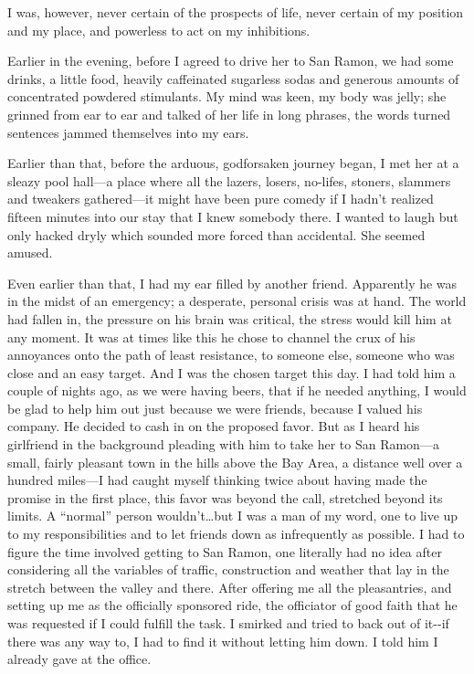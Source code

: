 I was, however, never certain of the prospects of life, never certain of
my position and my place, and powerless to act on my inhibitions.

Earlier in the evening, before I agreed to drive her to San Ramon, we
had some drinks, a little food, heavily caffeinated sugarless sodas and
generous amounts of concentrated powdered stimulants. My mind was keen,
my body was jelly; she grinned from ear to ear and talked of her life in
long phrases, the words turned sentences jammed themselves into my ears.

Earlier than that, before the arduous, godforsaken journey began, I met
her at a sleazy pool hall---a place where all the lazers, losers,
no-lifes, stoners, slammers and tweakers gathered---it might have been
pure comedy if I hadn't realized fifteen minutes into our stay that I
knew somebody there. I wanted to laugh but only hacked dryly which
sounded more forced than accidental. She seemed amused.

Even earlier than that, I had my ear filled by another friend.
Apparently he was in the midst of an emergency; a desperate, personal
crisis was at hand. The world had fallen in, the pressure on his brain
was critical, the stress would kill him at any moment. It was at times
like this he chose to channel the crux of his annoyances onto the path
of least resistance, to someone else, someone who was close and an easy
target. And I was the chosen target this day. I had told him a couple of
nights ago, as we were having beers, that if he needed anything, I would
be glad to help him out just because we were friends, because I valued
his company. He decided to cash in on the proposed favor. But as I heard
his girlfriend in the background pleading with him to take her to San
Ramon---a small, fairly pleasant town in the hills above the Bay Area, a
distance well over a hundred miles---I had caught myself thinking twice
about having made the promise in the first place, this favor was beyond
the call, stretched beyond its limits. A ``normal'' person
wouldn't\ldots but I was a man of my word, one to live up to my
responsibilities and to let friends down as infrequently as possible. I
had to figure the time involved getting to San Ramon, one literally had
no idea after considering all the variables of traffic, construction and
weather that lay in the stretch between the valley and there. After
offering me all the pleasantries, and setting up me as the officially
sponsored ride, the officiator of good faith that he was requested if I
could fulfill the task. I smirked and tried to back out of it-\/-if
there was any way to, I had to find it without letting him down. I told
him I already gave at the office.

